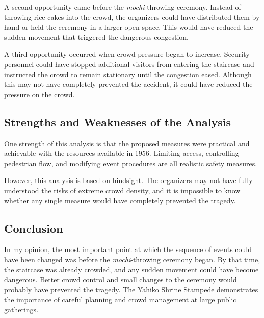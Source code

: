 \documentclass[platex,dvipdfmx,a4paper]{article}
\begin{document}
  A second opportunity came before the \textit{mochi}-throwing ceremony. Instead of throwing rice cakes into the crowd, the organizers could have distributed them by hand or held the ceremony in a larger open space. This would have reduced the sudden movement that triggered the dangerous congestion.
  
  A third opportunity occurred when crowd pressure began to increase. Security personnel could have stopped additional visitors from entering the staircase and instructed the crowd to remain stationary until the congestion eased. Although this may not have completely prevented the accident, it could have reduced the pressure on the crowd.
  
  \subsection*{Strengths and Weaknesses of the Analysis}
  
  One strength of this analysis is that the proposed measures were practical and achievable with the resources available in 1956. Limiting access, controlling pedestrian flow, and modifying event procedures are all realistic safety measures.
  
  However, this analysis is based on hindsight. The organizers may not have fully understood the risks of extreme crowd density, and it is impossible to know whether any single measure would have completely prevented the tragedy.
  
  \subsection*{Conclusion}
  
  In my opinion, the most important point at which the sequence of events could have been changed was before the \textit{mochi}-throwing ceremony began. By that time, the staircase was already crowded, and any sudden movement could have become dangerous. Better crowd control and small changes to the ceremony would probably have prevented the tragedy. The Yahiko Shrine Stampede demonstrates the importance of careful planning and crowd management at large public gatherings.
\end{document}
